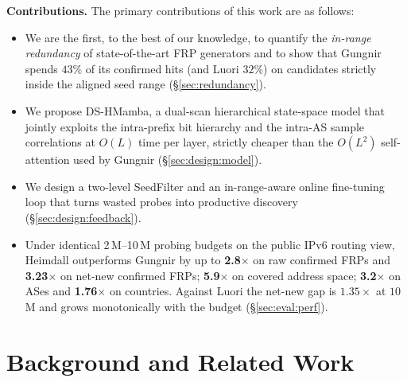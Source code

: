 \documentclass[conference]{IEEEtran}
\begin{document}
\smallskip\textbf{Contributions.}
The primary contributions of this work are as follows:
\begin{itemize}
    \item We are the first, to the best of our knowledge, to
    quantify the \emph{in-range redundancy} of state-of-the-art FRP
    generators and to show that Gungnir spends $43\%$ of its confirmed
    hits (and Luori $32\%$) on candidates strictly inside the aligned
    seed range (\S\ref{sec:redundancy}).
    \item We propose DS-HMamba, a dual-scan hierarchical state-space
    model that jointly exploits the intra-prefix bit hierarchy and
    the intra-AS sample correlations at $O(L)$ time per layer,
    strictly cheaper than the $O(L^2)$ self-attention used by
    Gungnir (\S\ref{sec:design:model}).
    \item We design a two-level SeedFilter and an in-range-aware
    online fine-tuning loop that turns wasted probes into productive
    discovery (\S\ref{sec:design:feedback}).
    \item Under identical 2\,M--10\,M probing budgets on the
    public IPv6 routing view, Heimdall outperforms Gungnir by up to
    \textbf{2.8$\times$} on raw confirmed FRPs and
    \textbf{3.23$\times$} on net-new confirmed FRPs;
    \textbf{5.9$\times$} on covered address space; \textbf{3.2$\times$}
    on ASes and \textbf{1.76$\times$} on countries.  Against Luori
    the net-new gap is $\mathbf{1.35\times}$ at $10$M and grows
    monotonically with the budget (\S\ref{sec:eval:perf}).
\end{itemize}


\section{Background and Related Work}\label{sec:background}
\end{document}
